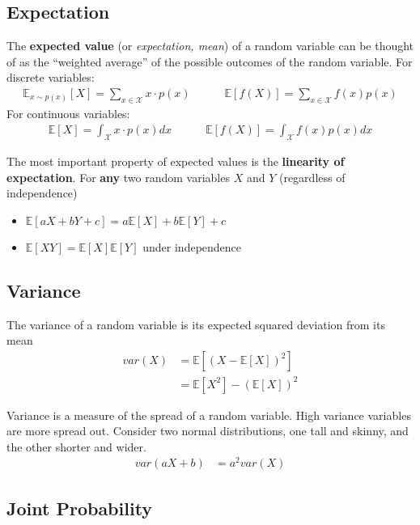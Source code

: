 \documentclass{harvardml}
\theoremstyle{definition}
\theoremstyle{plain}
\newcommand{\E}{\mathbb{E}}
\newcommand{\mcX}{\mathcal{X}}
\begin{document}
    \subsection{Expectation}
            
		The \textbf{expected value} (or \textit{expectation, mean}) 
		of a random variable can be thought of as the ``weighted average'' 
		of the possible outcomes of the random variable. For discrete variables:
		\begin{align*}
			\E_{x \sim p(x)}[X] = \sum_{x \in \mathcal{X}} x \cdot p(x) \quad \quad \quad
		    \E[f(X)] = \sum_{x \in \mcX} f(x) p(x)
		\end{align*}
		\noindent For continuous variables:
		\begin{align*}
			\E[X] = \int_{\mcX} x \cdot p(x) dx \quad \quad \quad \E[f(X)] = \int_{\mcX} f(x) p(x) dx
		\end{align*}

		\noindent The most important property of expected values is the 
		\textbf{linearity of expectation}. For \textbf{any} two random 
		variables $X$ and $Y$ (regardless of independence)
		\begin{itemize}
			\item $\E[aX + bY + c] = a\E[X] + b\E[Y] + c$
			\item $\E[XY] = \E[X]\E[Y]$ under independence
		\end{itemize}

	\subsection{Variance}
		The variance of a random variable is its expected squared 
		deviation from its mean
			\begin{align*}
				var(X) &= \E[ (X - \E[X])^2 ] \\ 
					   &= \E[X^2] - (\E[X])^2
			\end{align*}

		\noindent Variance is a measure of the spread of a random 
		variable. High variance variables are more spread out. 
		Consider two normal distributions, one tall and skinny, 
		and the other shorter and wider.
		\begin{align*}
			var(aX + b) &= a^2var(X)
		\end{align*}

    \subsection{Joint Probability}
\end{document}
